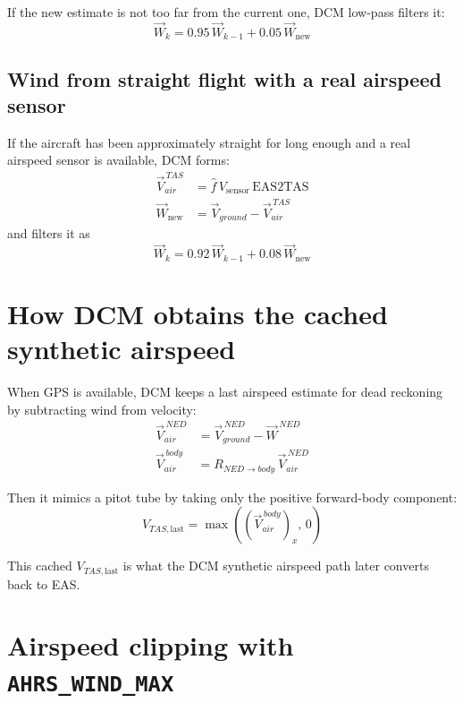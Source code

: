\documentclass[11pt]{article}
\begin{document}
If the new estimate is not too far from the current one, DCM low-pass filters it:
\begin{equation}
\vec{W}_{k} = 0.95\,\vec{W}_{k-1} + 0.05\,\vec{W}_{\text{new}}
\end{equation}

\subsection{Wind from straight flight with a real airspeed sensor}

If the aircraft has been approximately straight for long enough and a real airspeed sensor is available, DCM forms:
\begin{align}
\vec{V}_{air}^{\,TAS} &= \hat{f}\,V_{\text{sensor}}\,\text{EAS2TAS} \\
\vec{W}_{\text{new}} &= \vec{V}_{ground} - \vec{V}_{air}^{\,TAS}
\end{align}
and filters it as
\begin{equation}
\vec{W}_{k} = 0.92\,\vec{W}_{k-1} + 0.08\,\vec{W}_{\text{new}}
\end{equation}

\section{How DCM obtains the cached synthetic airspeed}

When GPS is available, DCM keeps a last airspeed estimate for dead reckoning by subtracting wind from velocity:
\begin{align}
\vec{V}_{air}^{\,NED} &= \vec{V}_{ground}^{\,NED} - \vec{W}^{\,NED} \\
\vec{V}_{air}^{\,body} &= R_{NED\rightarrow body}\,\vec{V}_{air}^{\,NED}
\end{align}

Then it mimics a pitot tube by taking only the positive forward-body component:
\begin{equation}
V_{TAS,\text{last}} = \max\left((\vec{V}_{air}^{\,body})_x,\,0\right)
\end{equation}

This cached $V_{TAS,\text{last}}$ is what the DCM synthetic airspeed path later converts back to EAS.

\section{Airspeed clipping with \texttt{AHRS\_WIND\_MAX}}
\label{sec:windmax_clip}
\end{document}
